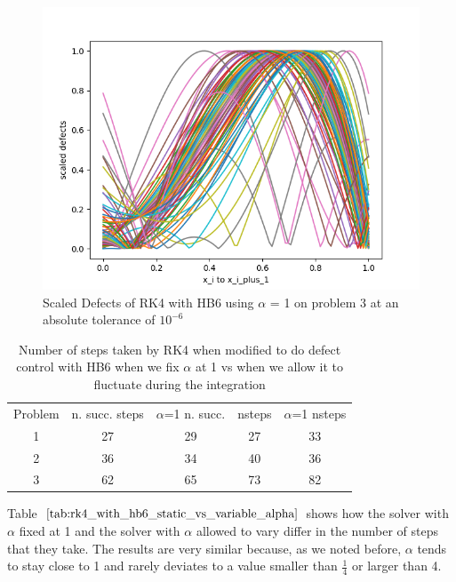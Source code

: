 \documentclass{article}
\begin{document}
\begin{figure}[H]
\centering
\includegraphics[width=0.7\linewidth]{./figures/static_alpha_rk4_with_hb6_p3_scaled_defects}
\caption{Scaled Defects of RK4 with HB6 using $\alpha$ = 1 on problem 3 at an absolute tolerance of $10^{-6}$}
\label{fig:static_alpha_rk4_with_hb6_p3_scaled_defects}
\end{figure}

\begin{table}[h]
\caption {Number of steps taken by RK4 when modified to do defect control with HB6 when we fix $\alpha$ at 1 vs when we allow it to fluctuate during the integration} \label{tab:rk4_with_hb6_static_vs_variable_alpha}
\begin{center}
\begin{tabular}{ c c c c c } 
Problem & n. succ. steps & $\alpha$=1 n. succ. & nsteps & $\alpha$=1 nsteps \\ 
1       & 27                      &        29               & 27         & 33\\ 
2       & 36                      &        34               & 40         & 36\\
3       & 62                      &        65               & 73         & 82\\
\end{tabular}
\end{center}
\end{table}

Table $\ref{tab:rk4_with_hb6_static_vs_variable_alpha}$ shows how the solver with $\alpha$ fixed at 1 and the solver with $\alpha$ allowed to vary differ in the number of steps that they take. The results are very similar because, as we noted before, $\alpha$ tends to stay close to 1 and rarely deviates to a value smaller than $\frac{1}{4}$ or larger than 4.
\end{document}
